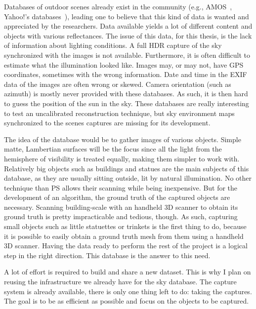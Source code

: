 Databases of outdoor scenes already exist in the community (e.g., AMOS~\cite{jacobs-cvpr-2007}, Yahoo!'s databases~\cite{thomee-arxiv-15}), leading one to believe that this kind of data is wanted and appreciated by the researchers. Data available yields a lot of different content and objects with various reflectances. The issue of this data, for this thesis, is the lack of information about lighting conditions. A full HDR capture of the sky synchronized with the images is not available. Furthermore, it is often difficult to estimate what the illumination looked like. Images may, or may not, have GPS coordinates, sometimes with the wrong information. Date and time in the EXIF data of the images are often wrong or skewed. Camera orientation (such as azimuth) is mostly never provided with these databases. As such, it is then hard to guess the position of the sun in the sky. These databases are really interesting to test an uncalibrated reconstruction technique, but sky environment maps synchronized to the scenes captures are missing for its development.

The idea of the database would be to gather images of various objects. Simple matte, Lambertian surfaces will be the focus since all the light from the hemisphere of visibility is treated equally, making them simpler to work with. Relatively big objects such as buildings and statues are the main subjects of this database, as they are usually sitting outside, lit by natural illumination. No other technique than PS allows their scanning while being inexpensive. But for the development of an algorithm, the ground truth of the captured objects are necessary. Scanning building-scale with an handheld 3D scanner to obtain its ground truth is pretty impracticable and tedious, though. As such, capturing small objects such as little statuettes or trinkets is the first thing to do, because it is possible to easily obtain a ground truth mesh from them using a handheld 3D scanner. Having the data ready to perform the rest of the project is a logical step in the right direction. This database is the answer to this need.

A lot of effort is required to build and share a new dataset. This is why I plan on reusing the infrastructure we already have for the sky database. The capture system is already available, there is only one thing left to do: taking the captures. The goal is to be as efficient as possible and focus on the objects to be captured.

